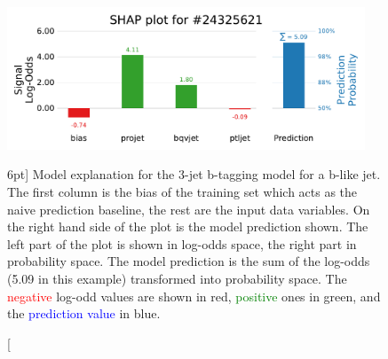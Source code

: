 \documentclass[a4paper, twoside, nobib]{tufte-book}
\begin{document}
\begin{figure}
  \includegraphics[width=0.95\textwidth, trim=0 0 0 40, clip]{figures/quarks/shap_values-down_sample=1.00-ML_vars=vertex-selection=b-ejet_min=4-n_iter_RS_lgb=99-n_iter_RS_xgb=9-cdot_cut=0.90-version=19-njet=3loc=24325621.pdf}
  \caption[SHAP Prediction Explanation for b-like jet][6pt]
          {Model explanation for the 3-jet b-tagging model for a b-like jet. The first column is the bias of the training set which acts as the naive prediction baseline, the rest are the input data variables. On the right hand side of the plot is the model prediction shown. The left part of the plot is shown in log-odds space, the right part in probability space. The model prediction is the sum of the log-odds (5.09 in this example) transformed into probability space. The \textcolor{red}{negative} log-odd values are shown in red, \textcolor{green}{positive} ones in green, and the \textcolor{blue}{prediction value} in blue. 
          } 
  \label{fig:q:shap_signal}
\end{figure}
\end{document}
